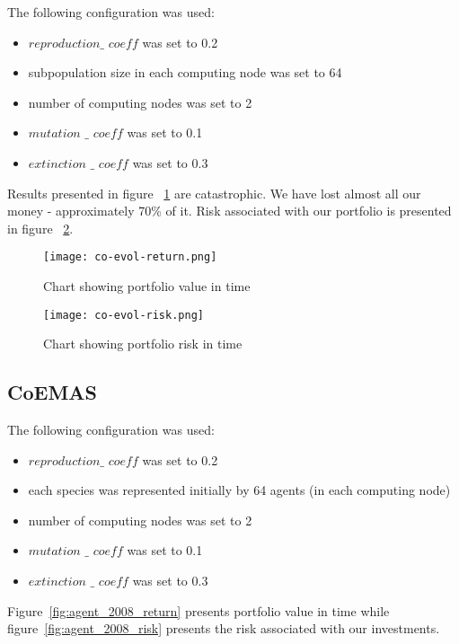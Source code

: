 The following configuration was used:
\begin{itemize}
  \item $reproduction\_$ $coeff$ was set to 0.2
  \item subpopulation size in each computing node was set to 64
  \item number of computing nodes was set to 2
  \item $mutation$ $\_$ $coeff$ was set to 0.1
  \item $extinction$ $\_$ $coeff$ was set to 0.3
\end{itemize}

Results presented in figure ~\ref{fig:co_evol_return} are catastrophic.
We have lost almost all our money - approximately 70\% of it.
Risk associated with our portfolio is presented in figure ~\ref{fig:co-evol-risk}.

\begin{figure}[ht]
  \begin{center}
    \texttt{[image: co-evol-return.png]}
  \end{center}
  \caption{Chart showing portfolio value in time}
  \label{fig:co_evol_return}
\end{figure}

\begin{figure}[ht]
  \begin{center}
    \texttt{[image: co-evol-risk.png]}
  \end{center}
  \caption{Chart showing portfolio risk in time}
  \label{fig:co-evol-risk}
\end{figure}


\subsection{CoEMAS}

The following configuration was used:
\begin{itemize}
  \item $reproduction\_$ $coeff$ was set to 0.2
  \item each species was represented initially by 64 agents (in each computing node)
  \item number of computing nodes was set to 2
  \item $mutation$ $\_$ $coeff$ was set to 0.1
  \item $extinction$ $\_$ $coeff$ was set to 0.3
\end{itemize}

Figure~\ref{fig:agent_2008_return} presents portfolio value in time while  figure~\ref{fig:agent_2008_risk} presents the risk associated with our investments.

